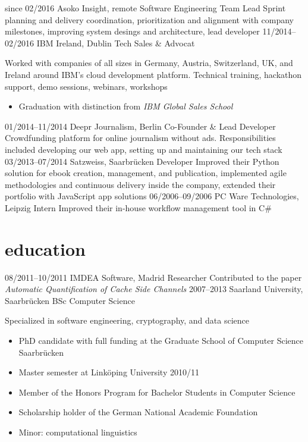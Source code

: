 \documentclass[a4paper]{cv}
\begin{document}
  \begin{entrylist}
    \entry
      {since 02/2016}
      {Asoko Insight, remote}
      {Software Engineering Team Lead}
      {Sprint planning and delivery coordination, prioritization and alignment with company milestones, improving system desings and architecture, lead developer}
    \entry
      {11/2014--02/2016}
      {IBM Ireland, Dublin}
      {Tech Sales \& Advocat}
      {Worked with companies of all sizes in Germany, Austria, Switzerland, UK, and Ireland around IBM’s cloud development platform. Technical training, hackathon support, demo sessions, webinars, workshops
        \begin{itemize}[leftmargin=0.3cm]
          \item Graduation with distinction from \emph{IBM Global Sales School}
        \end{itemize}
      }
    \entry
      {01/2014--11/2014}
      {Deepr Journalism, Berlin}
      {Co-Founder \& Lead Developer}
      {Crowdfunding platform for online journalism without ads. Responsibilities included developing our web app, setting up and maintaining our tech stack}
    \entry
      {03/2013--07/2014}
      {Satzweiss, Saarbrücken}
      {Developer}
      {Improved their Python solution for ebook creation, management, and publication, implemented agile methodologies and continuous delivery inside the company, extended their portfolio with JavaScript app solutions}
    \entry
      {06/2006--09/2006}
      {PC Ware Technologies, Leipzig}
      {Intern}
      {Improved their in-house workflow management tool in C\#}
  \end{entrylist}

  \section{education}

  \begin{entrylist}
    \entry
      {08/2011--10/2011}
      {IMDEA Software, Madrid}
      {Researcher}
      {Contributed to the paper \emph{Automatic Quantification of Cache Side Channels}}
    \entry
      {2007--2013}
      {Saarland University, Saarbrücken}
      {BSc Computer Science}
      {Specialized in software engineering, cryptography, and data science
        \begin{itemize}[leftmargin=0.3cm]
          \item PhD candidate with full funding at the Graduate School of Computer Science Saarbrücken
          \item Master semester at Linköping University 2010/11
          \item Member of the Honors Program for Bachelor Students in Computer Science
          \item Scholarship holder of the German National Academic Foundation
          \item Minor: computational linguistics
        \end{itemize}
      }
  \end{entrylist}
\end{document}
